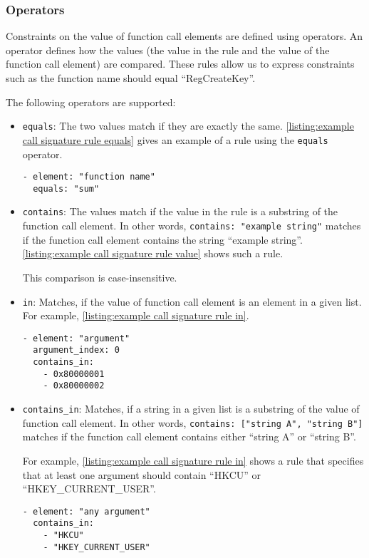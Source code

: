 \subsubsection{Operators}
Constraints on the value of function call elements are defined using operators. An operator defines how the values (the value in the rule and the value of the function call element) are compared. These rules allow us to express constraints such as the function name should equal ``RegCreateKey''.

The following operators are supported:
\begin{itemize}
  \item \texttt{equals}: The two values match if they are exactly the same. \autoref{listing:example call signature rule equals} gives an example of a rule using the \texttt{equals} operator.
\begin{lstlisting}[label={listing:example call signature rule equals}, caption={An example rule using the \texttt{equals} operator.}, captionpos=b]
- element: "function name"
  equals: "sum"
\end{lstlisting}

  \item \texttt{contains}: The values match if the value in the rule is a substring of the function call element. In other words, \texttt{contains: "example string"} matches if the function call element contains the string ``example string''. \autoref{listing:example call signature rule value} shows such a rule.

  This comparison is case-insensitive.

  \item \texttt{in}: Matches, if the value of function call element is an element in a given list. For example, \autoref{listing:example call signature rule in}.
\begin{lstlisting}[label={listing:example call signature rule in}, caption={An example rule using the \texttt{in} operator.}, captionpos=b]
- element: "argument"
  argument_index: 0
  contains_in:
    - 0x80000001
    - 0x80000002
\end{lstlisting}

  \item \texttt{contains\_in}: Matches, if a string in a given list is a substring of the value of function call element. In other words, \texttt{contains: ["string A", "string B"]} matches if the function call element contains either ``string A'' or ``string B''.

  For example, \autoref{listing:example call signature rule in} shows a rule that specifies that at least one argument should contain ``HKCU'' or ``HKEY\_CURRENT\_USER''.
\begin{lstlisting}[label={listing:example call signature rule contains_in}, caption={An example rule using the \texttt{contains\_in} operator.}, captionpos=b]
- element: "any argument"
  contains_in:
    - "HKCU"
    - "HKEY_CURRENT_USER"
\end{lstlisting}
\end{itemize}

